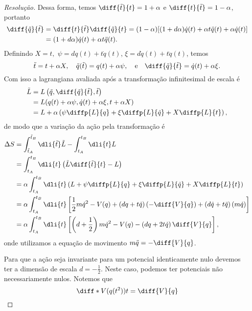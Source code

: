 \begin{proof}[Resolução]
    Dessa forma, temos \(\diff{\tilde{t}}{t} = 1 + \alpha\) e \(\diff{t}{\tilde{t}} = 1 - \alpha\), portanto
    \begin{align*}
        \diff{\tilde{q}}{\tilde{t}} &= \diff{t}{\tilde{t}} \diff{\tilde{q}}{t} = (1 - \alpha)[(1+d\alpha)\dot{q}(t) + \alpha t\ddot{q}(t) + \alpha \dot{q}(t)]\\
                                    &= (1 + d \alpha)\dot{q}(t) + \alpha t \ddot{q}(t).
    \end{align*}
    Definindo \(X = t,\) \(\psi = d q(t) + t \dot{q}(t)\), \(\xi = d \dot{q}(t) + t \ddot{q}(t)\), temos
    \begin{equation*}
        \tilde{t} = t + \alpha X,\quad\tilde{q}(\tilde{t}) = q(t) + \alpha \psi,\quad\text{e}\quad \diff{\tilde{q}}{\tilde{t}} = \dot{q}(t) + \alpha \xi.
    \end{equation*}
    Com isso a lagrangiana avaliada após a transformação infinitesimal de escala é
    \begin{align*}
        \tilde{L} &= L\left(\tilde{q}, \diff{\tilde{q}}{\tilde{t}}, \tilde{t}\right)\\
                  &= L(q(t) + \alpha \psi, \dot{q}(t) + \alpha\xi, t + \alpha X)\\
                  &= L + \alpha \left(\psi \diffp{L}{q} + \xi \diffp{L}{\dot{q}} + X\diffp{L}{t}\right),
    \end{align*}
    de modo que a variação da ação pela transformação é
    \begin{align*}
        \Delta S &= \int_{\tilde{t}_A}^{\tilde{t}_B}\dli{\tilde{t}} \tilde{L} - \int_{t_A}^{t_B} \dli{t} L\\
                 &= \int_{t_A}^{t_B} \dli{t} \left(\tilde{L}\diff{\tilde{t}}{t} - L\right)\\
                 &= \alpha\int_{t_A}^{t_B} \dli{t} \left(L + \psi\diffp{L}{q} + \xi\diffp{L}{\dot{q}} + X \diffp{L}{t}\right)\\
                 &= \alpha\int_{t_A}^{t_B} \dli{t} \left[\frac12 m \dot{q}^2 - V(q) + \left(d q + t\dot{q}\right)\left(-\diff{V}{q}\right) + \left(d\dot{q} + t\ddot{q}\right)\left(m \dot{q}\right)\right]\\
                 &= \alpha\int_{t_A}^{t_B} \dli{t} \left[\left(d + \frac12\right) m \dot{q}^2 - V(q) - \left(d q + 2t\dot{q}\right)\diff{V}{q}\right],
    \end{align*}
    onde utilizamos a equação de movimento \(m\ddot{q} = -\diff{V}{q}\).

    Para que a ação seja invariante para um potencial identicamente nulo devemos ter a dimensão de escala \(d = -\frac12\). Neste caso, podemos ter potenciais não necessariamente nulos. Notemos que
    \begin{equation*}
        \diff*{V(q(t^2))}{t} = \diff{V}{q}
    \end{equation*}
\end{proof}
